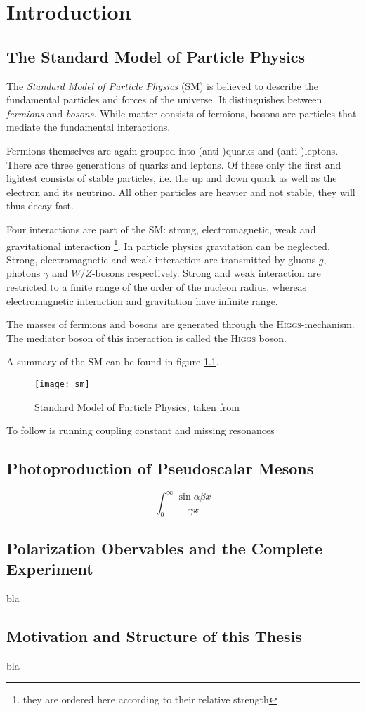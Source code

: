 
\chapter{Introduction}
\label{sec:intro}
\section{The Standard Model of Particle Physics}
The \emph{Standard Model of Particle Physics} (SM) is believed to describe the fundamental particles and forces of the universe. It distinguishes between \emph{fermions} and \emph{bosons}. While matter consists of fermions, bosons are particles that mediate the fundamental interactions. 

Fermions themselves are again grouped into (anti-)quarks and (anti-)leptons. There are three generations of quarks and leptons. Of these only the first and lightest consists of stable particles, i.e. the up and down quark as well as the electron and its neutrino. All other particles are heavier and not stable, they will thus decay fast.

Four interactions are part of the SM: strong, electromagnetic, weak and gravitational interaction \footnote{they are ordered here according to their relative strength}. In particle physics gravitation can be neglected. Strong, electromagnetic and weak interaction are transmitted by gluons $g$, photons $\gamma$ and $W/Z$-bosons respectively. Strong and weak interaction are restricted to a finite range of the order of the nucleon radius, whereas electromagnetic interaction and gravitation have infinite range.

The masses of fermions and bosons are generated through the \textsc{Higgs}-mechanism. The mediator boson of this interaction is called the \textsc{Higgs} boson.  

A summary of the SM can be found in figure \ref{fig:sm}. 

\begin{figure}[htbp]
	\centering
	\texttt{[image: sm]}
	\caption{Standard Model of Particle Physics, taken from \cite{sm}}
	\label{fig:sm}
\end{figure}

To follow is running coupling constant and missing resonances
\section{Photoproduction of Pseudoscalar Mesons}
$$\int_0^\infty\frac{\sin \alpha\beta x}{\gamma x}$$
\section{Polarization Obervables and the Complete Experiment}
bla
\section{Motivation and Structure of this Thesis}
bla
